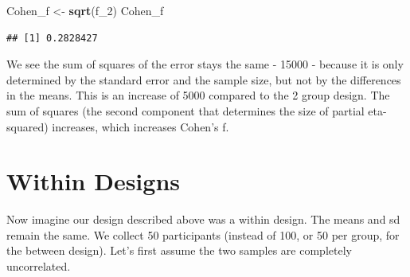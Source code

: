 \documentclass[]{book}
\newenvironment{Shaded}{\begin{snugshade}}{\end{snugshade}}
\newcommand{\CommentTok}[1]{\textcolor[rgb]{0.56,0.35,0.01}{\textit{#1}}}
\newcommand{\DataTypeTok}[1]{\textcolor[rgb]{0.13,0.29,0.53}{#1}}
\newcommand{\DecValTok}[1]{\textcolor[rgb]{0.00,0.00,0.81}{#1}}
\newcommand{\KeywordTok}[1]{\textcolor[rgb]{0.13,0.29,0.53}{\textbf{#1}}}
\newcommand{\NormalTok}[1]{#1}
\newcommand{\OperatorTok}[1]{\textcolor[rgb]{0.81,0.36,0.00}{\textbf{#1}}}
\newcommand{\StringTok}[1]{\textcolor[rgb]{0.31,0.60,0.02}{#1}}
\begin{document}
\begin{Shaded}
\begin{Highlighting}[]
\NormalTok{Cohen_f <-}\StringTok{ }\KeywordTok{sqrt}\NormalTok{(f_}\DecValTok{2}\NormalTok{)}
\NormalTok{Cohen_f}
\end{Highlighting}
\end{Shaded}

\begin{verbatim}
## [1] 0.2828427
\end{verbatim}

We see the sum of squares of the error stays the same - 15000 - because it is only determined by the standard error and the sample size, but not by the differences in the means. This is an increase of 5000 compared to the 2 group design. The sum of squares (the second component that determines the size of partial eta-squared) increases, which increases Cohen's f.~

\hypertarget{within-designs}{%
\section{Within Designs}\label{within-designs}}

Now imagine our design described above was a within design. The means and sd remain the same. We collect 50 participants (instead of 100, or 50 per group, for the between design). Let's first assume the two samples are completely uncorrelated.

\begin{Shaded}
\end{Shaded}
\end{document}
